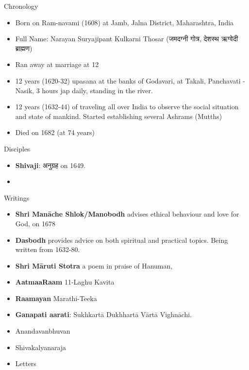 Chronology
\begin{itemize}[noitemsep,nolistsep]
\item Born on Ram-navami (1608) at Jamb, Jalna District, Maharashtra, India
\item Full Name: Narayan Suryajipant Kulkarni Thosar (जमदग्नी गोत्र, देशस्थ ऋग्वेदी ब्राह्मण)
\item Ran away at marriage at 12
\item 12 years (1620-32) upasana at the banks of Godavari, at Takali, Panchavati - Nasik, 3 hours jap daily, standing in the river.
\item 12 years (1632-44) of traveling all over India to observe the social situation and state of mankind. Started establishing several Ashrams (Mutths)
\item Died on 1682 (at 74 years)
\end{itemize}

Disciples
\begin{itemize}[noitemsep,nolistsep]
\item \textbf{Shivaji}: अनुग्रह   on 1649.
\item 
\end{itemize}

Writings
\begin{itemize}[noitemsep,nolistsep]
\item \textbf{Shri Manāche Shlok/Manobodh} advises ethical behaviour and love for God, on 1678
\item \textbf{Dasbodh} provides advice on both spiritual and practical topics. Being written from 1632-80. 
\item \textbf{Shri Māruti Stotra} a poem in praise of Hanuman, 
\item \textbf{AatmaaRaam} 11-Laghu Kavita
\item \textbf{Raamayan} Marathi-Teeka
\item \textbf{Ganapati aarati}: Sukhkartā Dukhhartā Vārtā Vighnāchi.
\item Anandavanbhuvan
\item Shivakalyanaraja
\item Letters
\end{itemize}

